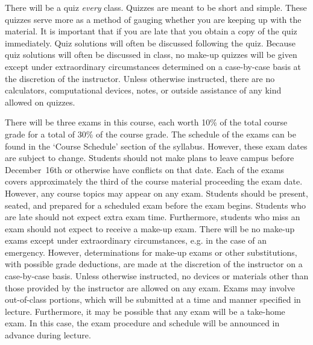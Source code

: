 \documentclass[11pt,letterpaper]{article}
\begin{document}
There will be a quiz \textit{every} class. Quizzes are meant to be short and simple. These quizzes serve more as a method of gauging whether you are keeping up with the material. It is important that if you are late that you obtain a copy of the quiz immediately. Quiz solutions will often be discussed following the quiz. Because quiz solutions will often be discussed in class, no make-up quizzes will be given except under extraordinary circumstances determined on a case-by-case basis at the discretion of the instructor. Unless otherwise instructed, there are no calculators, computational devices, notes, or outside assistance of any kind allowed on quizzes. \pspace





\newpage





There will be three exams in this course, each worth 10\% of the total course grade for a total of 30\% of the course grade. The schedule of the exams can be found in the `Course Schedule' section of the syllabus. However, these exam dates are subject to change. Students should not make plans to leave campus before December~16th or otherwise have conflicts on that date. Each of the exams covers approximately the third of the course material proceeding the exam date. However, any course topics may appear on any exam. Students should be present, seated, and prepared for a scheduled exam before the exam begins. Students who are late should not expect extra exam time. Furthermore, students who miss an exam should not expect to receive a make-up exam. There will be no make-up exams except under extraordinary circumstances, e.g. in the case of an emergency. However, determinations for make-up exams or other substitutions, with possible grade deductions, are made at the discretion of the instructor on a case-by-case basis. Unless otherwise instructed, no devices or materials other than those provided by the instructor are allowed on any exam. Exams may involve out-of-class portions, which will be submitted at a time and manner specified in lecture. Furthermore, it may be possible that any exam will be a take-home exam. In this case, the exam procedure and schedule will be announced in advance during lecture. 
\sectionbreak
\end{document}
